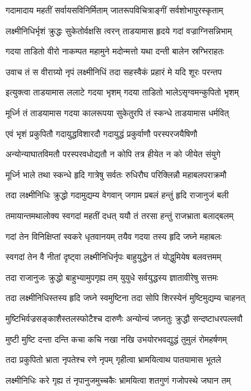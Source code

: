 \twolineshloka
{गदामादाय महतीं सर्वायसविनिर्मिताम्}
{जातरूपविचित्राङ्गीं सर्वशोभापुरस्कृताम्}%

\twolineshloka
{लक्ष्मीनिधिर्भृशं क्रुद्धः सुकेतोर्वक्षसि त्वरन्}
{ताडयामास हृदये गदां वज्राग्निसन्निभाम्}%

\twolineshloka
{गदया ताडितो वीरो नाकम्पत महामुने}
{मदोन्मत्तो यथा दन्ती बालेन स्रग्भिराहतः}%

\twolineshloka
{उवाच तं स वीराग्र्यो नृपं लक्ष्मीनिधिं तदा}
{सहस्वैकं प्रहारं मे यदि शूरः परन्तप}%

\twolineshloka
{इत्युक्त्वा ताडयामास ललाटे गदया भृशम्}
{गदया ताडितो भालेऽसृग्वमन्कुपितो भृशम्}%

\twolineshloka
{मूर्ध्नि तं ताडयामास गदया कालरूपया}
{सुकेतुरपि तं स्कन्धे ताडयामास धर्मवित्}%

\twolineshloka
{एवं भृशं प्रकुपितौ गदायुद्धविशारदौ}
{गदायुद्धं प्रकुर्वाणौ परस्परजयैषिणौ}%

\twolineshloka
{अन्योन्याघातविमतौ परस्परवधोद्यतौ}
{न कोपि तत्र हीयेत न को जीयेत संयुगे}%

\twolineshloka
{मूर्ध्नि भाले तथा स्कन्धे हृदि गात्रेषु सर्वतः}
{रुधिरौघ परिक्लिन्नौ महाबलपराक्रमौ}%

\twolineshloka
{तदा लक्ष्मीनिधिः क्रुद्धो गदामुद्यम्य वेगवान्}
{जगाम प्रबलं हन्तुं हृदि राजानुजं बली}%

\twolineshloka
{तमायान्तमथालोक्य स्वगदां महतीं दधत्}
{ययौ तं तरसा हन्तुं राजभ्राता बलाद्बलम्}%

\twolineshloka
{गदां तेन विनिक्षिप्तां स्वकरे धृतवानयम्}
{तयैव गदया तस्य हृदि जघ्ने महाबलः}%

\twolineshloka
{स्वगदां तेन वै नीतां दृष्ट्वा लक्ष्मीनिधिर्नृपः}
{बाहुयुद्धेन तं योद्धुमियेष बलवत्तमम्}%

\twolineshloka
{तदा राजानुजः क्रुद्धो बाहुभ्यामुपगृह्य तम्}
{युयुधे सर्वयुद्धस्य ज्ञातावीरेषु सत्तमः}%

\twolineshloka
{तदा लक्ष्मीनिधिस्तस्य हृदि जघ्ने स्वमुष्टिना}
{तदा सोपि शिरस्येनं मुष्टिमुद्यम्य चाहनत्}%

\twolineshloka
{मुष्टिभिर्वज्रसङ्काशैस्तलस्फोटैश्च दारुणैः}
{अन्योन्यं जघ्नतुः क्रुद्धौ सन्दष्टाधरपल्लवौ}%

\twolineshloka
{मुष्टी मुष्टि दन्ता दन्ति कचा कचि नखा नखि}
{उभयोरभवद्युद्धं तुमुलं रोमहर्षणम्}%

\twolineshloka
{तदा प्रकुपितो भ्राता नृपतेश्च रणे नृपम्}
{गृहीत्वा भ्रामयित्वाथ पातयामास भूतले}%

\twolineshloka
{लक्ष्मीनिधिः करे गृह्य तं नृपानुजमुच्चकैः}
{भ्रामयित्वा शतगुणं गजोपस्थे जघान तम्}%

